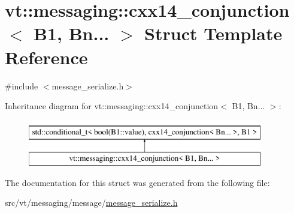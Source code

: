 \hypertarget{structvt_1_1messaging_1_1cxx14__conjunction_3_01_b1_00_01_bn_8_8_8_01_4}{}\section{vt\+:\+:messaging\+:\+:cxx14\+\_\+conjunction$<$ B1, Bn... $>$ Struct Template Reference}
\label{structvt_1_1messaging_1_1cxx14__conjunction_3_01_b1_00_01_bn_8_8_8_01_4}


{\ttfamily \#include $<$message\+\_\+serialize.\+h$>$}

Inheritance diagram for vt\+:\+:messaging\+:\+:cxx14\+\_\+conjunction$<$ B1, Bn... $>$\+:\begin{figure}[H]
\begin{center}
\leavevmode
\includegraphics[height=2.000000cm]{structvt_1_1messaging_1_1cxx14__conjunction_3_01_b1_00_01_bn_8_8_8_01_4}
\end{center}
\end{figure}


The documentation for this struct was generated from the following file\+:\begin{DoxyCompactItemize}
\item 
src/vt/messaging/message/\hyperlink{message__serialize_8h}{message\+\_\+serialize.\+h}\end{DoxyCompactItemize}
